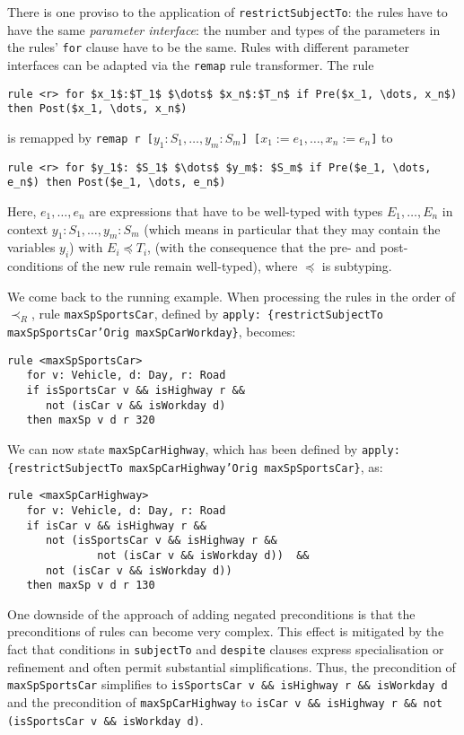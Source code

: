 There is one proviso to the application of \texttt{restrictSubjectTo}: the
rules have to have the same \emph{parameter interface}: the number and types
of the parameters in the rules' \texttt{for} clause have to be the same.
Rules with different parameter interfaces can be adapted via the
\texttt{remap} rule transformer. The rule 

\begin{lstlisting}[frame=none,mathescape=true]
rule <r> for $x_1$:$T_1$ $\dots$ $x_n$:$T_n$ if Pre($x_1, \dots, x_n$) then Post($x_1, \dots, x_n$)
\end{lstlisting}
is remapped by \texttt{remap r [$y_1: S_1, \dots, y_m: S_m$] [$x_1 := e_1, \dots, x_n := e_n$]}
to 
\begin{lstlisting}[frame=none,mathescape=true]
rule <r> for $y_1$: $S_1$ $\dots$ $y_m$: $S_m$ if Pre($e_1, \dots, e_n$) then Post($e_1, \dots, e_n$)
\end{lstlisting}
Here, $e_1, \dots, e_n$ are expressions that have to be well-typed with types $E_1, \dots, E_n$ in
context $y_1: S_1, \dots, y_m: S_m$ (which means in particular that they may
contain the variables $y_i$) with $E_i \preceq T_i$,  (with the consequence that
the pre- and post-conditions of the new rule remain well-typed), where $\preceq$ is subtyping. 


\begin{example}
We come back to the running example. When processing the rules in the order of
$\prec_R$, rule \texttt{maxSpSportsCar}, defined by
\texttt{apply: \{restrictSubjectTo maxSpSportsCar'Orig maxSpCarWorkday\}},
becomes:
\begin{lstlisting}
rule <maxSpSportsCar>
   for v: Vehicle, d: Day, r: Road
   if isSportsCar v && isHighway r &&
      not (isCar v && isWorkday d)
   then maxSp v d r 320
 \end{lstlisting}

 We can now state \texttt{maxSpCarHighway}, which has been defined by
 \texttt{apply: \{restrictSubjectTo maxSpCarHighway'Orig maxSpSportsCar\}}, as:

 \begin{lstlisting}
rule <maxSpCarHighway>
   for v: Vehicle, d: Day, r: Road
   if isCar v && isHighway r &&
      not (isSportsCar v && isHighway r &&
              not (isCar v && isWorkday d))  &&
      not (isCar v && isWorkday d))
   then maxSp v d r 130
\end{lstlisting}
\end{example}

One downside of the approach of adding negated preconditions is that the
preconditions of rules can become very complex. This effect is mitigated by
the fact that conditions in \texttt{subjectTo} and \texttt{despite} clauses
express specialisation or refinement and often permit substantial
simplifications. Thus, the precondition of \texttt{maxSpSportsCar} simplifies
to \texttt{isSportsCar v \&\& isHighway r \&\& isWorkday d} and the
precondition of \texttt{maxSpCarHighway} to
\texttt{isCar v \&\& isHighway r \&\& not (isSportsCar v \&\& isWorkday d)}.



